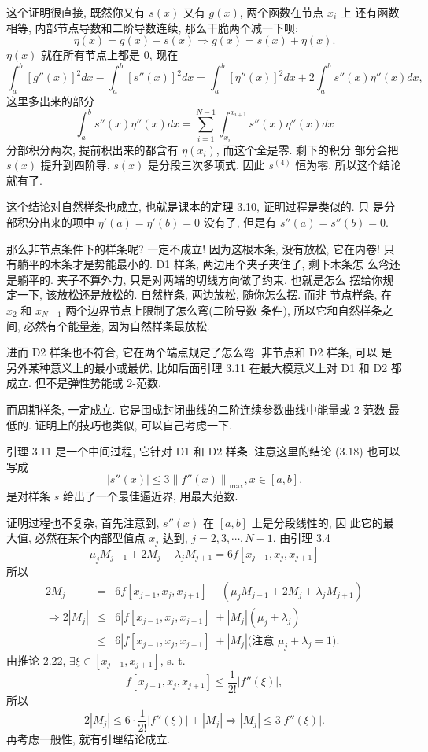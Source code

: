 \documentclass[a4paper]{ctexart}
\begin{document}
这个证明很直接, 既然你又有 $s(x)$ 又有 $g(x)$, 两个函数在节点 $x_i$ 上
还有函数相等, 内部节点导数和二阶导数连续, 那么干脆两个减一下呗:
$$
\eta(x) = g(x) - s(x) \Rightarrow g(x) = s(x) + \eta(x).
$$
$\eta(x)$ 就在所有节点上都是 $0$, 现在
$$
\int_a^b[g''(x)]^2 dx - \int_a^b[s''(x)]^2 dx
= \int_a^b[\eta''(x)]^2 dx + 2 \int_a^bs''(x)\eta''(x) dx,
$$
这里多出来的部分
$$
\int_a^bs''(x)\eta''(x) dx = \sum_{i = 1}^{N - 1} \int_{x_i}^{x_{i
    + 1}}s''(x)\eta''(x) dx
$$
分部积分两次, 提前积出来的都含有 $\eta(x_i)$, 而这个全是零. 剩下的积分
部分会把 $s(x)$ 提升到四阶导, $s(x)$ 是分段三次多项式, 因此 $s^{(4)}$
恒为零. 所以这个结论就有了.

这个结论对自然样条也成立, 也就是课本的定理 3.10, 证明过程是类似的. 只
是分部积分出来的项中 $\eta'(a) = \eta'(b) = 0$ 没有了, 但是有 $s''(a)
= s''(b) = 0$.

那么非节点条件下的样条呢? 一定不成立! 因为这根木条, 没有放松, 它在内卷!
只有躺平的木条才是势能最小的. D1 样条, 两边用个夹子夹住了, 剩下木条怎
么弯还是躺平的. 夹子不算外力, 只是对两端的切线方向做了约束, 也就是怎么
摆给你规定一下, 该放松还是放松的. 自然样条, 两边放松, 随你怎么摆. 而非
节点样条, 在 $x_2$ 和 $x_{N - 1}$ 两个边界节点上限制了怎么弯(二阶导数
条件), 所以它和自然样条之间, 必然有个能量差, 因为自然样条最放松.

进而 D2 样条也不符合, 它在两个端点规定了怎么弯. 非节点和 D2 样条, 可以
是另外某种意义上的最小或最优, 比如后面引理 3.11 在最大模意义上对 D1 和
D2 都成立. 但不是弹性势能或 2-范数.

而周期样条, 一定成立. 它是围成封闭曲线的二阶连续参数曲线中能量或 2-范数
最低的. 证明上的技巧也类似, 可以自己考虑一下.

引理 3.11 是一个中间过程, 它针对 D1 和 D2 样条. 注意这里的结论 (3.18) 也可以写成
$$
\left|s''(x)\right| \leq 3 \left\|f''(x)\right\|_{\max}, x \in [a,b].
$$
是对样条 $s$ 给出了一个最佳逼近界, 用最大范数.

证明过程也不复杂, 首先注意到, $s''(x)$ 在 $[a, b]$ 上是分段线性的, 因
此它的最大值, 必然在某个内部型值点 $x_j$ 达到, $j = 2, 3, \cdots, N - 1$. 由引理 3.4
$$
\mu_j M_{j - 1} + 2 M_j + \lambda_j M_{j + 1} = 6 f[x_{j - 1}, x_j, x_{j + 1}]
$$
所以
$$
\begin{array}{rcl}
  2 M_j &=& 6 f[x_{j - 1}, x_j, x_{j + 1}] - (\mu_j M_{j - 1} + 2 M_j + \lambda_j M_{j + 1}) \\
  \Rightarrow 2|M_j| &\leq& 6 |f[x_{j - 1}, x_j, x_{j + 1}]| + |M_j| (\mu_j + \lambda_j) \\
  &\leq&  6 |f[x_{j - 1}, x_j, x_{j + 1}]| + |M_j| \mbox{(注意 $\mu_j + \lambda_j = 1$)}.
\end{array}
$$
由推论 2.22, $\exists \xi \in [x_{j - 1}, x_{j + 1}]$, s. t.
$$
f[x_{j - 1}, x_j, x_{j + 1}] \leq \frac{1}{2!}\left|f''(\xi)\right|,
$$
所以
$$
2 |M_j| \leq 6 \cdot \frac{1}{2!}\left|f''(\xi)\right| + |M_j| \Rightarrow |M_j| \leq 3\left|f''(\xi)\right|.
$$
再考虑一般性, 就有引理结论成立.
\end{document}
